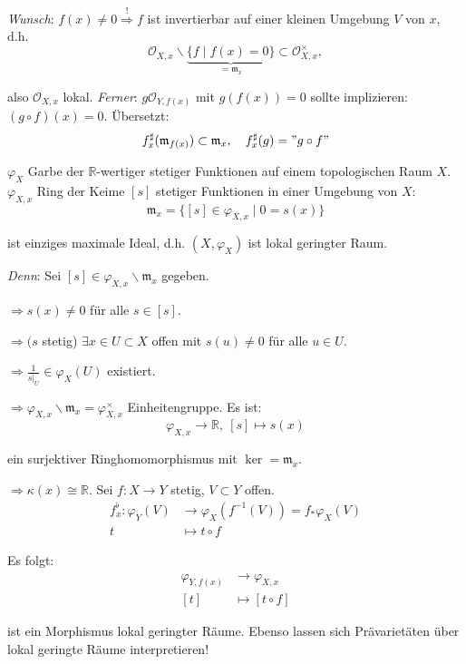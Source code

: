\emph{Wunsch}: $f(x)\neq0\overset{!}{\Rightarrow}f$ ist invertierbar
auf einer kleinen Umgebung $V$ von $x$, d.h. 
\[
\mathcal{O}_{X,x}\backslash\underbrace{\{f\mid f(x)=0\}}_{=\mathfrak{m}_{x}}\subset\mathcal{O}_{X,x}^{\times},
\]

also $\mathcal{O}_{X,x}$ lokal. \emph{Ferner}: $g\mathcal{O}_{Y,f(x)}$
mit $g(f(x))=0$ sollte implizieren: $(g\circ f)(x)=0$. Übersetzt:
\[
f_{x}^{\sharp}(\mathfrak{m}_{f(x)})\subset\mathfrak{m}_{x},\quad f_{x}^{\sharp}(g)="g\circ f"
\]

\begin{example}[orig. 32]
$\varphi_{X}$ Garbe der $\mathbb{R}$-wertiger stetiger Funktionen
auf einem topologischen Raum $X$. $\varphi_{X,x}$ Ring der Keime
$[s]$ stetiger Funktionen in einer Umgebung von $X$:
\[
\mathfrak{m}_{x}=\{[s]\in\varphi_{X,x}\mid0=s(x)\}
\]

ist einziges maximale Ideal, d.h. $(X,\varphi_{X})$ ist lokal geringter
Raum. 

\emph{Denn}: Sei $[s]\in\varphi_{X,x}\backslash\mathfrak{m}_{x}$
gegeben.

$\Rightarrow s(x)\neq0$ für alle $s\in[s]$. 

$\Rightarrow(s$ stetig) $\exists x\in U\subset X$ offen mit $s(u)\neq0$
für alle $u\in U$.

$\Rightarrow\frac{1}{s|_{U}}\in\varphi_{X}(U)$ existiert.

$\Rightarrow\varphi_{X,x}\backslash\mathfrak{m}_{x}=\varphi_{X,x}^{\times}$
Einheitengruppe. Es ist: 
\[
\varphi_{X,x}\rightarrow\mathbb{R},\ [s]\mapsto s(x)
\]

ein surjektiver Ringhomomorphismus mit $\ker=\mathfrak{m}_{x}$.

$\Rightarrow\kappa(x)\cong\mathbb{R}$. Sei $f:X\rightarrow Y$ stetig,
$V\subset Y$ offen.
\begin{align*}
f_{x}^{\flat}:\varphi_{Y}(V) & \longrightarrow\varphi_{X}(f^{-1}(V))=f_{\ast}\varphi_{X}(V)\\
t & \longmapsto t\circ f
\end{align*}

Es folgt:
\begin{align*}
\varphi_{Y,f(x)} & \longrightarrow\varphi_{X,x}\\{}
[t] & \longmapsto[t\circ f]
\end{align*}

ist ein Morphismus lokal geringter Räume. Ebenso lassen sich Prävarietäten
über lokal geringte Räume interpretieren!
\end{example}
